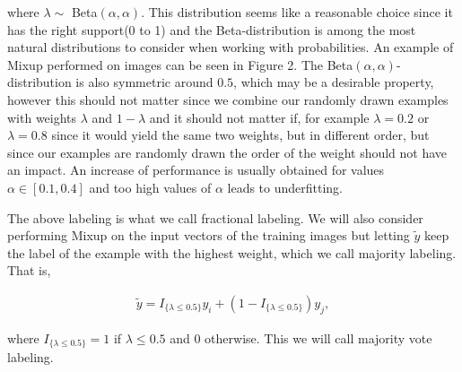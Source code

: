 \documentclass{article}
\begin{document}
where $\lambda \sim$ Beta$(\alpha, \alpha)$.
 This distribution seems like a 
reasonable choice since it has the right support(0 to 1) and the Beta-distribution is among the most natural distributions to
consider when working with probabilities. 
An example of Mixup performed on images can be seen in Figure 2.
The Beta$(\alpha, \alpha)$-distribution is also symmetric around $0.5$, which may be 
a desirable property, however this should not matter since we combine our randomly drawn examples with weights $\lambda$ and $1-\lambda$ and 
it should not matter if, for example $\lambda = 0.2$ or $\lambda = 0.8$ since it would yield the same two weights, but in different order, but 
since our examples are randomly drawn the order of the weight should not have an impact. An increase of performance
is usually obtained for values $\alpha \in [0.1, 0.4]$ and too high 
values of $\alpha$ leads to underfitting.

% 

The above labeling is what we call fractional labeling.
We will also consider performing Mixup on the input vectors of the training images but letting $\tilde{y}$ keep the label of the example 
with the highest weight, which we call majority labeling. That is,

\begin{align*}
\tilde{y} = I_{\{ \lambda \leq 0.5 \}} y_i + (1-I_{\{ \lambda \leq 0.5 \}}) y_j, 
\end{align*}

where $I_{\{ \lambda \leq 0.5 \}} = 1$ if $\lambda \leq 0.5$ and $0$ otherwise. This we will call majority vote labeling.
\end{document}
